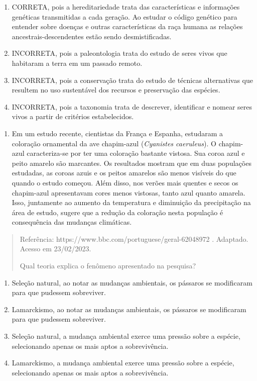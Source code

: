\begin{enumerate}
\def\labelenumi{(\Alph{enumi})}
\item
  CORRETA, pois a hereditariedade trata das características e
  informações genéticas transmitidas a cada geração. Ao estudar o código
  genético para entender sobre doenças e outras características da raça
  humana as relações ancestrais-descendentes estão sendo
  desmistificadas.
\item
  INCORRETA, pois a paleontologia trata do estudo de seres vivos que
  habitaram a terra em um passado remoto.
\item
  INCORRETA, pois a conservação trata do estudo de técnicas alternativas
  que resultem no uso sustentável dos recursos e preservação das
  espécies.
\item
  INCORRETA, pois a taxonomia trata de descrever, identificar e nomear
  seres vivos a partir de critérios estabelecidos.
\end{enumerate}

\begin{enumerate}
\def\labelenumi{\arabic{enumi}.}
\item
  Em um estudo recente, cientistas da França e Espanha, estudaram a
  coloração ornamental da ave chapim-azul (\emph{Cyanistes caeruleus}).
  O chapim-azul caracteriza-se por ter uma coloração bastante vistosa.
  Sua coroa azul e peito amarelo são marcantes. Os resultados mostram
  que em duas populações estudadas, as coroas azuis e os peitos amarelos
  são menos visíveis do que quando o estudo começou. Além disso, nos
  verões mais quentes e secos os chapim-azul apresentavam cores menos
  vistosas, tanto azul quanto amarela. Isso, juntamente ao aumento da
  temperatura e diminuição da precipitação na área de estudo, sugere que
  a redução da coloração nesta população é consequência das mudanças
  climáticas.
\end{enumerate}

\begin{quote}
Referência: https://www.bbc.com/portuguese/geral-62048972 . Adaptado.
Acesso em 23/02/2023.

Qual teoria explica o fenômeno apresentado na pesquisa?
\end{quote}

\begin{enumerate}
\def\labelenumi{(\Alph{enumi})}
\item
  Seleção natural, ao notar as mudanças ambientais, os pássaros se
  modificaram para que pudessem sobreviver.
\item
  Lamarckismo, ao notar as mudanças ambientais, os pássaros se
  modificaram para que pudessem sobreviver.
\item
  Seleção natural, a mudança ambiental exerce uma pressão sobre a
  espécie, selecionando apenas os mais aptos a sobrevivência.
\item
  Lamarckismo, a mudança ambiental exerce uma pressão sobre a espécie,
  selecionando apenas os mais aptos a sobrevivência.
\end{enumerate}

